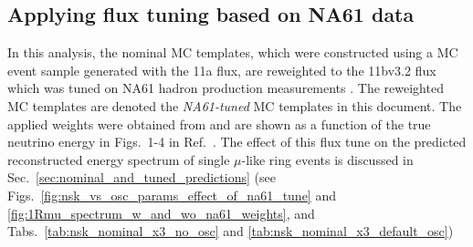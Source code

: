 \subsection {Applying flux tuning based on NA61 data}
\label{sec:na61_weights}

In this analysis, the nominal MC templates, which were constructed using a MC event sample generated with the 11a flux,
are reweighted to the 11bv3.2 flux which was tuned on NA61 hadron production measurements \cite{FluxTuning}\cite{NA61T2K}.
The reweighted MC templates are denoted the {\em NA61-tuned} MC templates in this document.
The applied weights were obtained from \cite{FluxTuningHistograms} and are shown as a function of the true neutrino energy 
in Figs.\ 1-4 in Ref.\ \cite{OurRun123DisappAnalysis3Flavour}.
The effect of this flux tune on the predicted reconstructed energy spectrum of 
single $\mu$-like ring events is discussed in Sec.\ \ref{sec:nominal_and_tuned_predictions} 
(see Figs.\ \ref{fig:nsk_vs_osc_params_effect_of_na61_tune} and \ref{fig:1Rmu_spectrum_w_and_wo_na61_weights}, and 
Tabs.\ \ref{tab:nsk_nominal_x3_no_osc} and \ref{tab:nsk_nominal_x3_default_osc})

%
%

